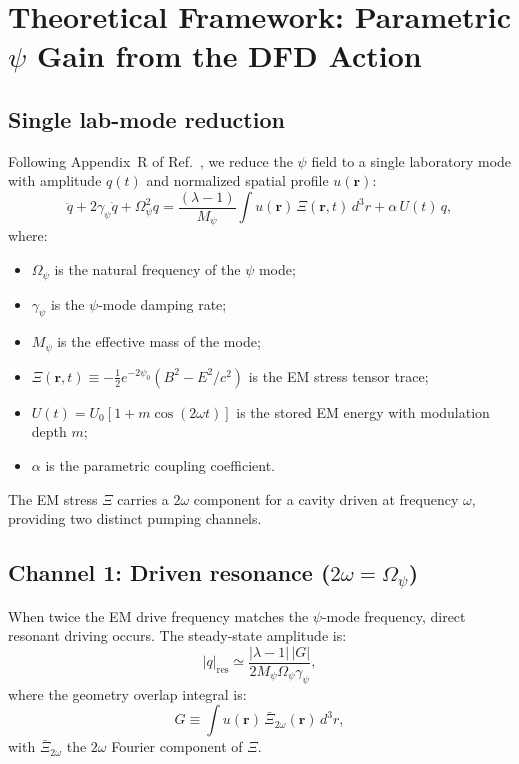 \documentclass[12pt,aps,prd,twocolumn,superscriptaddress,nofootinbib]{revtex4-2}
\newcommand{\Opsi}{\Omega_\psi}
\newcommand{\gpsi}{\gamma_\psi}
\newcommand{\Mpsi}{M_\psi}
\begin{document}
\section{Theoretical Framework: Parametric $\psi$ Gain from the DFD Action}
\label{sec:theory}

\subsection{Single lab-mode reduction}

Following Appendix~R of Ref.~\cite{Alcock2025DFD}, we reduce the $\psi$
field to a single laboratory mode with amplitude $q(t)$ and normalized
spatial profile $u(\mathbf{r})$:
\begin{equation}
\boxed{
  \ddot{q} + 2\gpsi\dot{q} + \Opsi^2 q
  = \frac{(\lambda-1)}{\Mpsi}\int u(\mathbf{r})\,\Xi(\mathbf{r},t)\,d^3r
    + \alpha\,U(t)\,q,
}
\label{eq:mode_eq}
\end{equation}
where:
\begin{itemize}[noitemsep]
  \item $\Opsi$ is the natural frequency of the $\psi$ mode;
  \item $\gpsi$ is the $\psi$-mode damping rate;
  \item $\Mpsi$ is the effective mass of the mode;
  \item $\Xi(\mathbf{r},t) \equiv -\tfrac{1}{2}e^{-2\psi_0}
    (B^2 - E^2/c^2)$ is the EM stress tensor trace;
  \item $U(t) = U_0[1 + m\cos(2\omega t)]$ is the stored EM energy with
    modulation depth $m$;
  \item $\alpha$ is the parametric coupling coefficient.
\end{itemize}

The EM stress $\Xi$ carries a $2\omega$ component for a cavity driven at
frequency $\omega$, providing two distinct pumping channels.

\subsection{Channel 1: Driven resonance ($2\omega = \Opsi$)}

When twice the EM drive frequency matches the $\psi$-mode frequency,
direct resonant driving occurs.  The steady-state amplitude is:
\begin{equation}
  |q|_{\mathrm{res}} \simeq
    \frac{|\lambda-1|\,|G|}{2\Mpsi\Opsi\gpsi},
  \label{eq:driven_res}
\end{equation}
where the geometry overlap integral is:
\begin{equation}
  G \equiv \int u(\mathbf{r})\,\bar{\Xi}_{2\omega}(\mathbf{r})\,d^3r,
  \label{eq:overlap_G}
\end{equation}
with $\bar{\Xi}_{2\omega}$ the $2\omega$ Fourier component of $\Xi$.
\end{document}
